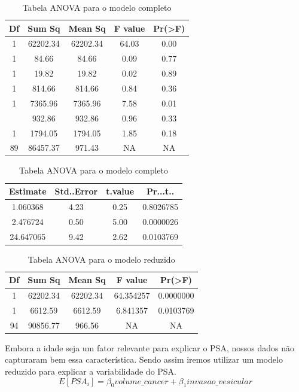 \documentclass[runningheads]{llncs}\usepackage[]{graphicx}\usepackage[]{color}
\newenvironment{knitrout}{}{} %
\begin{document}
\begin{knitrout}
\color{fgcolor}\begin{table}

\caption{\label{tab:unnamed-chunk-17}Tabela ANOVA para o modelo completo}
\centering
\begin{tabular}[t]{ccccc}
\toprule
Df & Sum Sq & Mean Sq & F value & Pr(>F)\\
\midrule
\rowcolor{gray!6}  1 & 62202.34 & 62202.34 & 64.03 & 0.00\\
1 & 84.66 & 84.66 & 0.09 & 0.77\\
\rowcolor{gray!6}  1 & 19.82 & 19.82 & 0.02 & 0.89\\
1 & 814.66 & 814.66 & 0.84 & 0.36\\
\rowcolor{gray!6}  1 & 7365.96 & 7365.96 & 7.58 & 0.01\\
\addlinespace
1 & 932.86 & 932.86 & 0.96 & 0.33\\
\rowcolor{gray!6}  1 & 1794.05 & 1794.05 & 1.85 & 0.18\\
89 & 86457.37 & 971.43 & NA & NA\\
\bottomrule
\end{tabular}
\end{table}

\begin{table}

\caption{\label{tab:unnamed-chunk-17}Tabela ANOVA para o modelo completo}
\centering
\begin{tabular}[t]{cccc}
\toprule
Estimate & Std..Error & t.value & Pr...t..\\
\midrule
\rowcolor{gray!6}  1.060368 & 4.23 & 0.25 & 0.8026785\\
2.476724 & 0.50 & 5.00 & 0.0000026\\
\rowcolor{gray!6}  24.647065 & 9.42 & 2.62 & 0.0103769\\
\bottomrule
\end{tabular}
\end{table}

\begin{table}

\caption{\label{tab:unnamed-chunk-17}Tabela ANOVA para o modelo reduzido}
\centering
\begin{tabular}[t]{ccccc}
\toprule
Df & Sum Sq & Mean Sq & F value & Pr(>F)\\
\midrule
\rowcolor{gray!6}  1 & 62202.34 & 62202.34 & 64.354257 & 0.0000000\\
1 & 6612.59 & 6612.59 & 6.841357 & 0.0103769\\
\rowcolor{gray!6}  94 & 90856.77 & 966.56 & NA & NA\\
\bottomrule
\end{tabular}
\end{table}


\end{knitrout}
Embora a idade seja um fator relevante para explicar o PSA, nossos dados não capturaram bem essa característica. Sendo assim iremos utilizar um modelo reduzido para explicar a variabilidade do PSA.
\begin{equation}
  E[PSA_i] = \beta_0 volume\_cancer+ \beta_1 invasao\_vesicular
\end{equation}
\end{document}
